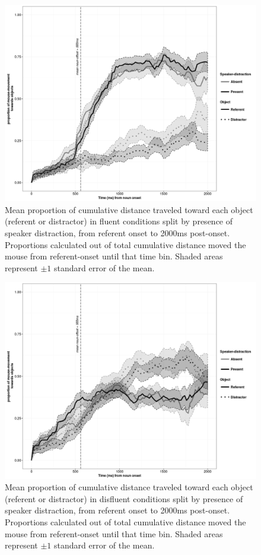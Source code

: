 \documentclass[a4paper,man,natbib]{apa6}
\begin{document}
\begin{figure}[Ht]
  \centering
	\includegraphics[scale=.5]{mflu.png}
  \caption{Mean proportion of cumulative distance traveled toward each object (referent or distractor) in fluent conditions split by presence of speaker distraction, from referent onset to 2000ms post-onset. Proportions calculated out of total cumulative distance moved the mouse from referent-onset until that time bin. Shaded areas represent $\pm 1$ standard error of the mean.}
  \label{fig:mflu}
\end{figure}


\begin{figure}[Ht]
  \centering
	\includegraphics[scale=.5]{mdisfl.png}
  \caption{Mean proportion of cumulative distance traveled toward each object (referent or distractor) in disfluent conditions split by presence of speaker distraction, from referent onset to 2000ms post-onset. Proportions calculated out of total cumulative distance moved the mouse from referent-onset until that time bin. Shaded areas represent $\pm 1$ standard error of the mean.}
  \label{fig:mdis}
\end{figure}
\end{document}
